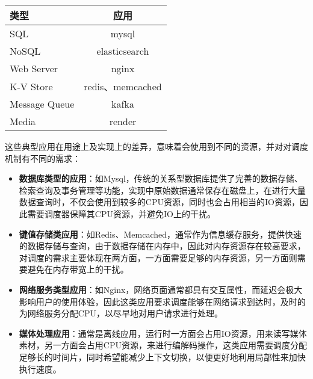 \begin{table}
    \label{tab:typical_application} 
    \footnotesize%
    \setlength{\tabcolsep}{4pt}%
    \renewcommand{\arraystretch}{1.25}%
    \centering
    \begin{tabular}{lc}
        \hline
        类型 & 应用\\
        \hline
        SQL & mysql\\
        NoSQL & elasticsearch\\
        Web Server & nginx\\
        K-V Store & redis、memcached\\
        Message Queue & kafka\\
        Media & render\\
        \hline
    \end{tabular}
\end{table}

这些典型应用在用途上及实现上的差异，意味着会使用到不同的资源，并对对调度机制有不同的需求：

\begin{itemize}
    \item \textbf{数据库类型的应用}：如Mysql，传统的关系型数据库提供了完善的数据存储、检索查询及事务管理等功能，实现中原始数据通常保存在磁盘上，在进行大量数据查询时，不仅会使用到较多的CPU资源，同时也会占用相当的IO资源，因此需要调度器保障其CPU资源，并避免IO上的干扰。
    \item \textbf{键值存储类应用}：如Redis、Memcached，通常作为信息缓存服务，提供快速的数据存储与查询，由于数据存储在内存中，因此对内存资源存在较高要求，对调度的需求主要体现在两方面，一方面需要足够的内存资源，另一方面则需要避免在内存带宽上的干扰。
    \item \textbf{网络服务类型应用}：如Nginx，网络页面通常都具有交互属性，而延迟会极大影响用户的使用体验，因此这类应用要求调度能够在网络请求到达时，及时的为网络服务分配CPU，以尽早地对用户请求进行处理。
    \item \textbf{媒体处理应用}：通常是离线应用，运行时一方面会占用IO资源，用来读写媒体素材，另一方面会占用CPU资源，来进行编解码操作，这类应用需要调度分配足够长的时间片，同时希望能减少上下文切换，以便更好地利用局部性来加快执行速度。
\end{itemize}

